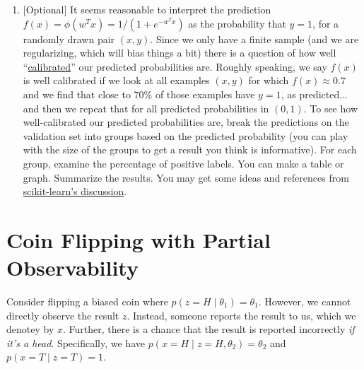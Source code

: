 \documentclass{article}
\theoremstyle{plain}
\theoremstyle{definition}
\begin{document}
\begin{enumerate}
\item {[}Optional{]} 
It seems reasonable to interpret the prediction $f(x)=\phi(w^{T}x)=1/(1+e^{-w^{T}x})$
as the probability that $y=1$, for a randomly drawn pair $\left(x,y\right)$.
Since we only have a finite sample (and we are regularizing, which
will bias things a bit) there is a question of how well ``\href{https://en.wikipedia.org/wiki/Calibration_(statistics)}{calibrated}''
our predicted probabilities are. Roughly speaking, we say $f(x)$
is well calibrated if we look at all examples $\left(x,y\right)$
for which $f(x)\approx0.7$ and we find that close to $70\%$ of those
examples have $y=1$, as predicted... and then we repeat that for
all predicted probabilities in $\left(0,1\right)$. To see how well-calibrated
our predicted probabilities are, break the predictions on the validation
set into groups based on the predicted probability (you can play with
the size of the groups to get a result you think is informative).
For each group, examine the percentage of positive labels. You can
make a table or graph. Summarize the results. You may get some ideas
and references from \href{http://scikit-learn.org/stable/modules/calibration.html}{scikit-learn's discussion}. 
\setcounter{saveenum}{\value{enumi}}
\end{enumerate}
\section{Coin Flipping with Partial Observability}
Consider flipping a biased coin where $p(z=H\mid \theta_1) = \theta_1$.
However, we cannot directly observe the result $z$.
Instead, someone reports the result to us,
which we denotey by $x$.
Further, there is a chance that the result is reported incorrectly \emph{if it's a head}.
Specifically, we have $p(x=H\mid z=H, \theta_2) = \theta_2$
and $p(x=T\mid z=T) = 1$.
\end{document}
